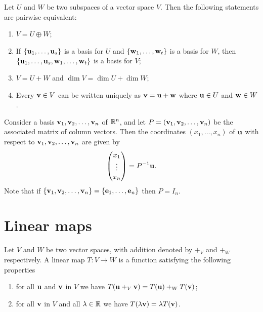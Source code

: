\documentclass[10pt, a4paper]{article}
\begin{document}
\begin{proposition}
    Let $U$ and $W$ be two subspaces of a vector space $V$.
    Then the following statements are pairwise equivalent:
    \begin{enumerate}[label = (\roman*)]
        \item $V = U \oplus W$;
        \item If $\{\mathbf{u}_1, \dotsc, \mathbf{u}_s\}$ is a basis for $U$ and $\{\mathbf{w}_1, \dotsc, \mathbf{w}_t\}$ is a basis for $W$,
        then $\{\mathbf{u}_1, \dotsc, \mathbf{u}_s, \mathbf{w}_1, \dotsc, \mathbf{w}_t\}$ is a basis for $V$;
        \item $V = U + W$ and $\dim{V} = \dim{U} + \dim{W}$;
        \item Every $\mathbf{v} \in V$ can be written uniquely as $\mathbf{v} = \mathbf{u} + \mathbf{w}$ where $\mathbf{u} \in U$ and $\mathbf{w} \in W$.
    \end{enumerate}
\end{proposition}

\begin{lemma}
    Consider a basis $\mathbf{v}_1, \mathbf{v}_2, \dotsc, \mathbf{v}_n$ of $\mathbb{R} ^ n$,
    and let $P = (\mathbf{v}_1, \mathbf{v}_2, \dotsc, \mathbf{v}_n)$ be the associated matrix of column vectors.
    Then the coordinates $(x_1, \dotsc, x_n)$ of $\mathbf{u}$ with respect to $\mathbf{v}_1, \mathbf{v}_2, \dotsc, \mathbf{v}_n$ are given by
    \[
    \begin{pmatrix}
        x_1 \\ \vdots \\ x_n
    \end{pmatrix} = P ^ {-1}\mathbf{u}.
    \]
    Note that if $\{\mathbf{v}_1, \mathbf{v}_2, \dotsc, \mathbf{v}_n\} = \{\mathbf{e}_1, \dotsc, \mathbf{e}_n\}$ then $P = I_n$.
\end{lemma}

\newpage

\section{Linear maps}

\begin{definition}
    Let $V$ and $W$ be two vector spaces,
    with addition denoted by $+_{V}$ and $+_{W}$ respectively.
    A linear map $T : V \rightarrow W$ is a function satisfying the following properties
    \begin{enumerate}[label = (\roman*)]
        \item for all $\mathbf{u}$ and $\mathbf{v}$ in $V$ we have $T(\mathbf{u} +_{V} \mathbf{v}) = T(\mathbf{u}) +_{W} T(\mathbf{v})$;
        \item for all $\mathbf{v}$ in $V$ and all $\lambda \in \mathbb{R}$ we have $T(\lambda\mathbf{v}) = \lambda T(\mathbf{v})$.
    \end{enumerate}
\end{definition}
\end{document}
